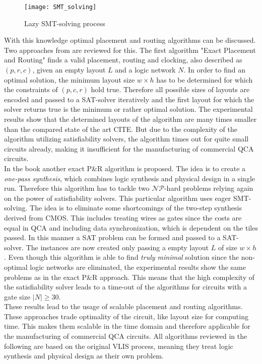 \begin{figure}
	\centering
	\texttt{[image: SMT\_solving]}
	\caption{Lazy SMT-solving  process \cite{SMT}}\label{fig:SMT_solving}
\end{figure}

With this knowledge optimal placement and routing algorithms can be discussed. Two approaches from \cite{Walter} are reviewed for this. The first algorithm "Exact Placement and Routing" finds a valid placement, routing and clocking, also described as $(p, r, c)$, given an empty layout $L$ and a logic network $N$. In order to find an optimal solution, the minimum layout size $w \times h$
has to be determined for which the constraints of $(p, c, r)$ hold true. Therefore all possible sizes of layouts are encoded and passed to a SAT-solver iteratively and the first layout for which the solver returns true is the minimum or rather optimal solution. The experimental results show that the determined layouts of the algorithm are many times smaller than the compared state of the art CITE. But due to the complexity of the algorithm utilizing satisfiability solvers, the algorithm times out for quite small circuits already, making it insufficient for the manufacturing of commercial QCA circuits.\\
In the book \cite{Walter} another exact P\&R algorithm is proposed. The idea is to create a \textit{one-pass synthesis}, which combines logic synthesis and physical design in a single run. Therefore this algorithm has to tackle two $\mathcal{NP}$-hard problems relying again on the power of satisfiability solvers. This particular algorithm uses eager SMT-solving. The idea is to eliminate some shortcomings of the two-step synthesis derived from CMOS. This includes treating wires as gates since the costs are equal in QCA and including data synchronization, which is dependent on the tiles passed. In this manner a SAT problem can be formed and passed to a SAT-solver. The instances are now created only passing a empty layout $L$ of size $w \times h$. Even though this algorithm is able to find \textit{truly minimal} solution since the non-optimal logic networks are eliminated, the experimental results show the same problems as in the exact P\&R approach. This means that the high complexity of the satisfiability solver leads to a time-out of the algorithms for circuits with a gate size $|N| \geq 30$.\\
These results lead to the usage of scalable placement and routing algorithms. These approaches trade optimality of the circuit, like layout size for computing time. This makes them scalable in the time domain and therefore applicable for the manufacturing of commercial QCA circuits. All algorithms reviewed in the following are based on the original VLIS process, meaning they treat logic synthesis and physical design as their own problem.\\
